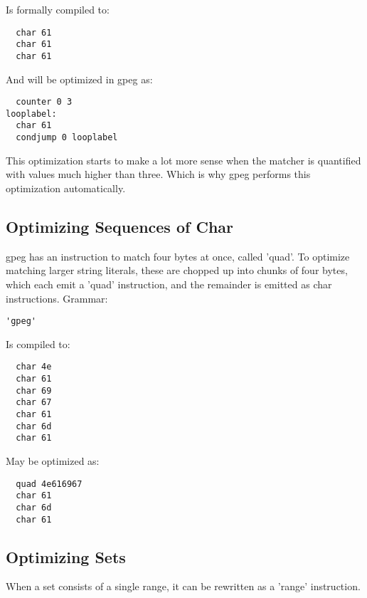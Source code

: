 Is formally compiled to:

\begin{myquote}
\begin{verbatim}
  char 61
  char 61
  char 61
\end{verbatim}
\end{myquote}

And will be optimized in gpeg as:

\begin{myquote}
\begin{verbatim}
  counter 0 3
looplabel:
  char 61
  condjump 0 looplabel
\end{verbatim}
\end{myquote}

This optimization starts to make a lot more sense when the matcher
is quantified with values much higher than three. Which is why
gpeg performs this optimization automatically.

\subsection{Optimizing Sequences of Char}

gpeg has an instruction to match four bytes at once, called 'quad'.
To optimize matching larger string literals, these are chopped up into
chunks of four bytes, which each emit a 'quad' instruction,
and the remainder is emitted as char instructions.
Grammar:

\begin{myquote}
\begin{verbatim}
'gpeg'
\end{verbatim}
\end{myquote}

Is compiled to:

\begin{myquote}
\begin{verbatim}
  char 4e
  char 61
  char 69
  char 67
  char 61
  char 6d
  char 61
\end{verbatim}
\end{myquote}

May be optimized as:

\begin{myquote}
\begin{verbatim}
  quad 4e616967
  char 61
  char 6d
  char 61
\end{verbatim}
\end{myquote}

\subsection{Optimizing Sets}
When a set consists of a single range, it can be rewritten as a 'range'
instruction.

